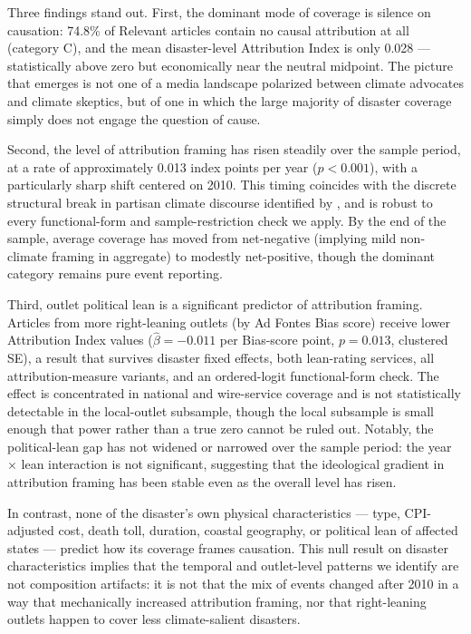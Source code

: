 \documentclass[12pt]{article}
\begin{document}
Three findings stand out.  First, the dominant mode of coverage is
silence on causation: 74.8\% of Relevant articles contain no causal
attribution at all (category C), and the mean disaster-level
Attribution Index is only 0.028 --- statistically above zero but
economically near the neutral midpoint.  The picture that emerges is
not one of a media landscape polarized between climate advocates and
climate skeptics, but of one in which the large majority of disaster
coverage simply does not engage the question of cause.

Second, the level of attribution framing has risen steadily over the
sample period, at a rate of approximately 0.013 index points per year
($p < 0.001$), with a particularly sharp shift centered on 2010.  This
timing coincides with the discrete structural break in partisan climate
discourse identified by \citet{chinn2020}, and is robust to every
functional-form and sample-restriction check we apply.  By the end of
the sample, average coverage has moved from net-negative (implying mild
non-climate framing in aggregate) to modestly net-positive, though the
dominant category remains pure event reporting.

Third, outlet political lean is a significant predictor of attribution
framing.  Articles from more right-leaning outlets (by Ad Fontes Bias
score) receive lower Attribution Index values ($\hat\beta = -0.011$
per Bias-score point, $p = 0.013$, clustered SE), a result that
survives disaster fixed effects, both lean-rating services, all
attribution-measure variants, and an ordered-logit functional-form
check.  The effect is concentrated in national and wire-service
coverage and is not statistically detectable in the local-outlet
subsample, though the local subsample is small enough that power rather
than a true zero cannot be ruled out.  Notably, the political-lean gap
has not widened or narrowed over the sample period: the year $\times$
lean interaction is not significant, suggesting that the ideological
gradient in attribution framing has been stable even as the overall
level has risen.

In contrast, none of the disaster's own physical characteristics ---
type, CPI-adjusted cost, death toll, duration, coastal geography, or
political lean of affected states --- predict how its coverage frames
causation.  This null result on disaster characteristics implies that
the temporal and outlet-level patterns we identify are not composition
artifacts: it is not that the mix of events changed after 2010 in a way
that mechanically increased attribution framing, nor that right-leaning
outlets happen to cover less climate-salient disasters.
\end{document}
